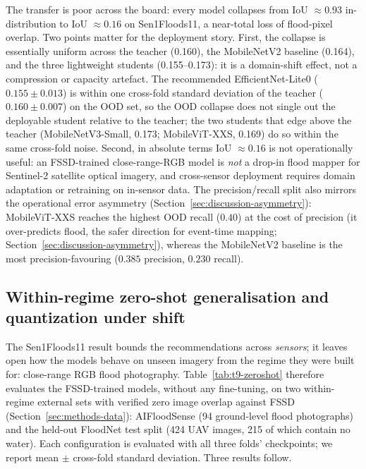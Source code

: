 

The transfer is poor across the board: every model collapses from IoU $\approx 0.93$ in-distribution to IoU $\approx 0.16$ on Sen1Floods11, a near-total loss of flood-pixel overlap. Two points matter for the deployment story. First, the collapse is essentially uniform across the teacher (0.160), the MobileNetV2 baseline (0.164), and the three lightweight students (0.155--0.173): it is a domain-shift effect, not a compression or capacity artefact. The recommended EfficientNet-Lite0 ($0.155 \pm 0.013$) is within one cross-fold standard deviation of the teacher ($0.160 \pm 0.007$) on the OOD set, so the OOD collapse does not single out the deployable student relative to the teacher; the two students that edge above the teacher (MobileNetV3-Small, 0.173; MobileViT-XXS, 0.169) do so within the same cross-fold noise. Second, in absolute terms IoU $\approx 0.16$ is not operationally useful: an FSSD-trained close-range-RGB model is \emph{not} a drop-in flood mapper for Sentinel-2 satellite optical imagery, and cross-sensor deployment requires domain adaptation or retraining on in-sensor data. The precision/recall split also mirrors the operational error asymmetry (Section~\ref{sec:discussion-asymmetry}): MobileViT-XXS reaches the highest OOD recall ($0.40$) at the cost of precision (it over-predicts flood, the safer direction for event-time mapping; Section~\ref{sec:discussion-asymmetry}), whereas the MobileNetV2 baseline is the most precision-favouring ($0.385$ precision, $0.230$ recall).

\subsection{Within-regime zero-shot generalisation and quantization under shift}
\label{sec:results-zeroshot}

The Sen1Floods11 result bounds the recommendations across \emph{sensors}; it leaves open how the models behave on unseen imagery from the regime they were built for: close-range RGB flood photography. Table~\ref{tab:t9-zeroshot} therefore evaluates the FSSD-trained models, without any fine-tuning, on two within-regime external sets with verified zero image overlap against FSSD (Section~\ref{sec:methods-data}): AIFloodSense (94 ground-level flood photographs) and the held-out FloodNet test split (424 UAV images, 215 of which contain no water). Each configuration is evaluated with all three folds' checkpoints; we report mean $\pm$ cross-fold standard deviation. Three results follow.

